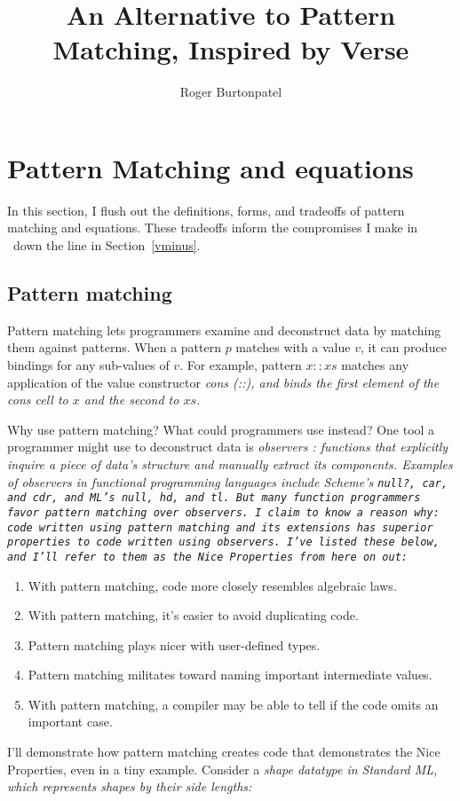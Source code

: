 \documentclass[manuscript,screen,review, 12pt, nonacm]{acmart}
\title{An Alternative to Pattern Matching, Inspired by Verse}
\author{Roger Burtonpatel}
\affiliation{%
  \institution{Tufts University}
  \streetaddress{419 Boston Ave}
  \city{Medford}
  \state{Massachusetts}
  \country{USA}
  \postcode{02155}
}
\begin{document}
\section{Pattern Matching and equations}
\label{pmandequations}

In this section, I flush out the definitions, forms, and tradeoffs of pattern
matching and equations. These tradeoffs inform the compromises I make in
\VMinus\ down the line in Section~\ref{vminus}.

\subsection{Pattern matching}
\label{pmoverobservers}


Pattern matching lets programmers examine and deconstruct data by matching them
against patterns. When a pattern $p$ matches with a value $v$, it can produce
bindings for any sub-values of $v$. For example, pattern $x::xs$ matches any 
application of the value constructor \it{cons} (\it{::}), and binds the first 
element of the cons cell to $x$ and the second to $xs$. 

Why use pattern matching? What could programmers use instead? One tool a
programmer might use to deconstruct data is \it{observers}
\cite{liskov:abstraction}: functions that explicitly inquire a piece of data's
structure and manually extract its components. Examples of observers in
functional programming languages include Scheme's \tt{null?}, \tt{car}, and
\tt{cdr}, and ML's \tt{null}, \tt{hd}, and \tt{tl}. But many function
programmers favor pattern matching over observers. I claim to know a reason why:
\it{code written using pattern matching and its extensions has superior
properties to code written using observers}. I've listed these below, and I'll
refer to them as the Nice Properties from here on out: 
\bf{\begin{enumerate}
    \item With pattern matching, code more closely resembles algebraic laws. 
    \label{p1}
    \item With pattern matching, it's easier to avoid duplicating code.
    \label{p2}
    \item Pattern matching plays nicer with user-defined types. 
    \label{p3}
    \item Pattern matching militates toward naming important intermediate
    values. \nolinebreak
    \label{p4}
    \item With pattern matching, a compiler may be able to tell if the code
    omits an important case. 
    \label{p5}
\end{enumerate}}
I'll demonstrate how pattern matching creates code that demonstrates the Nice
Properties, even in a tiny example. Consider a \it{shape} datatype in Standard
ML, which represents shapes by their side lengths: 
\end{document}
